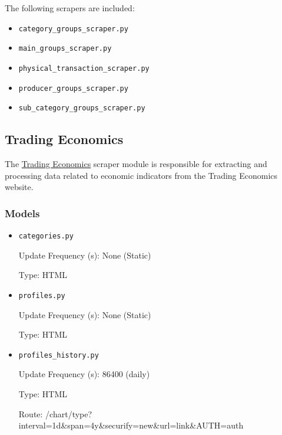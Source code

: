 {	The following scrapers are included:

	\begin{itemize}
		\item \texttt{category\_groups\_scraper.py}


		\item \texttt{main\_groups\_scraper.py}


		\item \texttt{physical\_transaction\_scraper.py}


		\item \texttt{producer\_groups\_scraper.py}


		\item \texttt{sub\_category\_groups\_scraper.py}
	\end{itemize}

	\newpage
	\subsection{Trading Economics}
	The \hyperlink{https://tradingeconomics.com}{Trading Economics} scraper module is responsible for extracting and processing data related to economic indicators from the Trading Economics website.

	\subsubsection{Models}

	\begin{itemize}
		\item \texttt{categories.py}

		Update Frequency (s): None (Static)

		Type: HTML

		\item \texttt{profiles.py}

		Update Frequency (s): None (Static)

		Type: HTML


		\item \texttt{profiles\_history.py}

		Update Frequency (s): 86400 (daily)

		Type: HTML

		Route: /chart/{type}?interval=1d\&span=4y\&securify=new\&url={link}\&AUTH={auth}



\end{itemize}}
